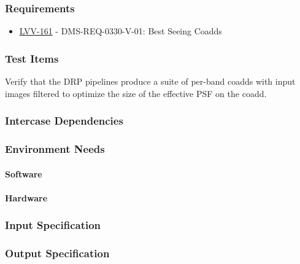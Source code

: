 \subsubsection{Requirements}
\begin{itemize}
\item \href{https://jira.lsstcorp.org/browse/LVV-161}{LVV-161} - DMS-REQ-0330-V-01: Best Seeing Coadds
\end{itemize}

\subsubsection{Test Items}
Verify that the DRP pipelines produce a suite of per-band coadds with
input images filtered to optimize the size of the effective PSF on the
coadd.



\subsubsection{Intercase Dependencies}

\subsubsection{Environment Needs}

\paragraph{Software}

\paragraph{Hardware}

\subsubsection{Input Specification}

\subsubsection{Output Specification}

